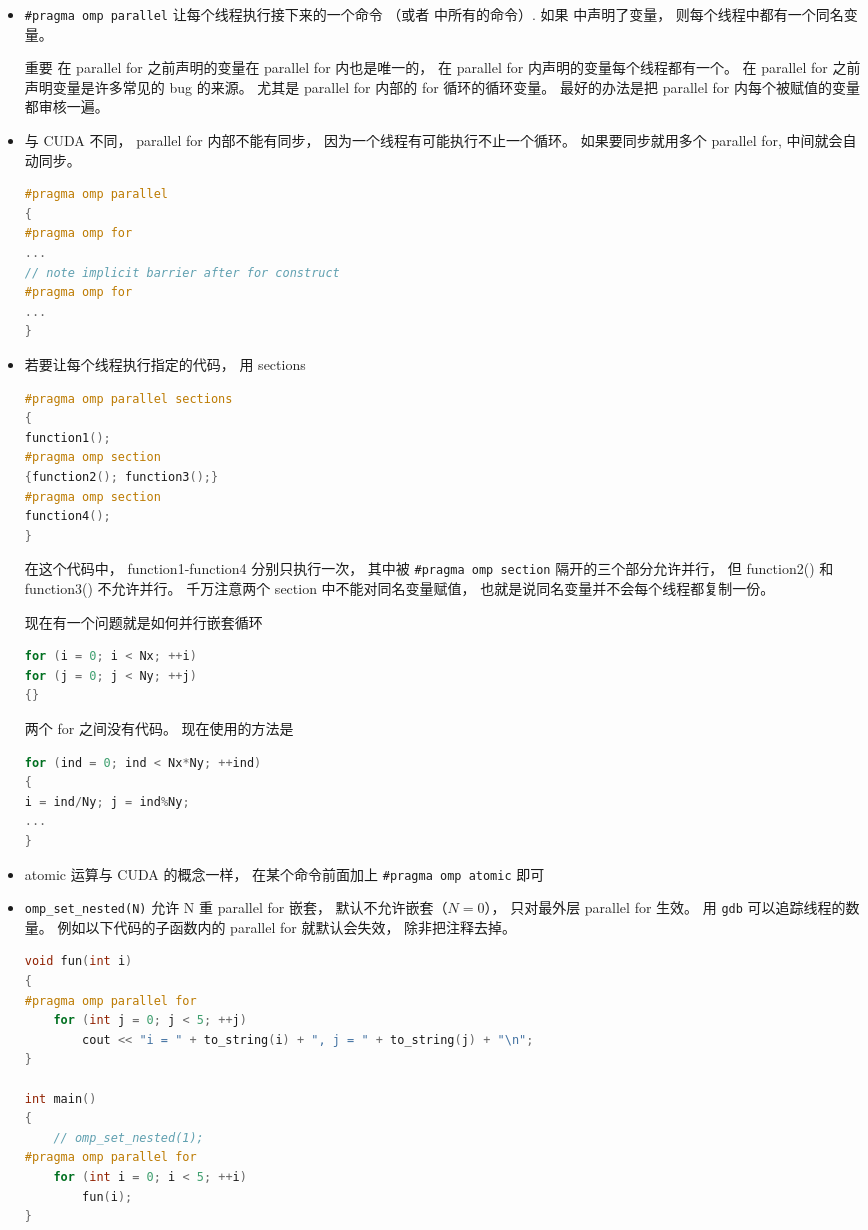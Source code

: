\begin{itemize}
\item \verb|#pragma omp parallel| 让每个线程执行接下来的一个命令 （或者 {} 中所有的命令）. 如果 {} 中声明了变量， 则每个线程中都有一个同名变量。
\item [重要] 在 parallel for 之前声明的变量在 parallel for 内也是唯一的， 在 parallel for 内声明的变量每个线程都有一个。 在 parallel for 之前声明变量是许多常见的 bug 的来源。 尤其是 parallel for 内部的 for 循环的循环变量。 最好的办法是把 parallel for 内每个被赋值的变量都审核一遍。
\item 与 CUDA 不同， parallel for 内部不能有同步， 因为一个线程有可能执行不止一个循环。 如果要同步就用多个 parallel for, 中间就会自动同步。
\begin{lstlisting}[language=cpp]
#pragma omp parallel
{
#pragma omp for
...
// note implicit barrier after for construct
#pragma omp for
...
}
\end{lstlisting}
\item 若要让每个线程执行指定的代码， 用 sections
\begin{lstlisting}[language=cpp]
#pragma omp parallel sections
{
function1();
#pragma omp section
{function2(); function3();}
#pragma omp section
function4();
}
\end{lstlisting}
在这个代码中， function1-function4 分别只执行一次， 其中被 \verb|#pragma omp section| 隔开的三个部分允许并行， 但 function2() 和 function3() 不允许并行。 千万注意两个 section 中不能对同名变量赋值， 也就是说同名变量并不会每个线程都复制一份。

现在有一个问题就是如何并行嵌套循环
\begin{lstlisting}[language=cpp]
for (i = 0; i < Nx; ++i)
for (j = 0; j < Ny; ++j)
{}
\end{lstlisting}
两个 for 之间没有代码。 现在使用的方法是
\begin{lstlisting}[language=cpp]
for (ind = 0; ind < Nx*Ny; ++ind)
{
i = ind/Ny; j = ind%Ny;
...
}
\end{lstlisting}
\item atomic 运算与 CUDA 的概念一样， 在某个命令前面加上 \verb|#pragma omp atomic| 即可
\item \verb|omp_set_nested(N)| 允许 N 重 parallel for 嵌套， 默认不允许嵌套（$N=0$）， 只对最外层 parallel for 生效。 用 \verb|gdb| 可以追踪线程的数量。 例如以下代码的子函数内的 parallel for 就默认会失效， 除非把注释去掉。
\begin{lstlisting}[language=cpp]
void fun(int i)
{
#pragma omp parallel for
	for (int j = 0; j < 5; ++j)
		cout << "i = " + to_string(i) + ", j = " + to_string(j) + "\n";
}

int main()
{
	// omp_set_nested(1);
#pragma omp parallel for
	for (int i = 0; i < 5; ++i)
		fun(i);
}
\end{lstlisting}
\end{itemize}
